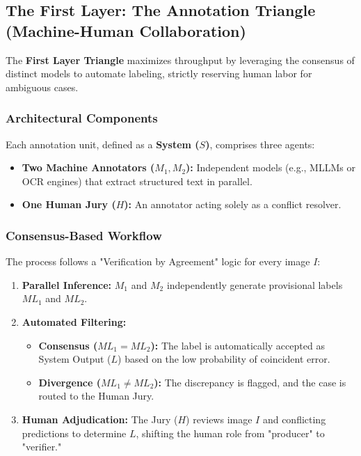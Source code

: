

\subsection{The First Layer: The Annotation Triangle (Machine-Human Collaboration)}
\label{subsec:layer1}

The \textbf{First Layer Triangle} maximizes throughput by leveraging the consensus of distinct models to automate labeling, strictly reserving human labor for ambiguous cases.

\subsubsection{Architectural Components}
Each annotation unit, defined as a \textbf{System ($S$)}, comprises three agents:
\begin{itemize}
    \item \textbf{Two Machine Annotators ($M_1, M_2$):} Independent models (e.g., MLLMs or OCR engines) that extract structured text in parallel.
    \item \textbf{One Human Jury ($H$):} An annotator acting solely as a conflict resolver.
\end{itemize}


\subsubsection{Consensus-Based Workflow}
The process follows a "Verification by Agreement" logic for every image $I$:
\begin{enumerate}
    \item \textbf{Parallel Inference:} $M_1$ and $M_2$ independently generate provisional labels $ML_1$ and $ML_2$.
    \item \textbf{Automated Filtering:}
    \begin{itemize}
        \item \textbf{Consensus ($ML_1 = ML_2$):} The label is automatically accepted as System Output ($L$) based on the low probability of coincident error.
        \item \textbf{Divergence ($ML_1 \neq ML_2$):} The discrepancy is flagged, and the case is routed to the Human Jury.
    \end{itemize}
    \item \textbf{Human Adjudication:} The Jury ($H$) reviews image $I$ and conflicting predictions to determine $L$, shifting the human role from "producer" to "verifier."
\end{enumerate}

